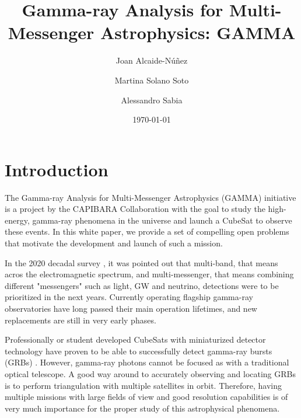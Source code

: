 \documentclass[
    aps,
    prd,
    twocolumn,
    nofootinbib,
    floatfix,
    superscriptaddress,
]{revtex4-2}
\begin{document}
\title{Gamma-ray Analysis for Multi-Messenger Astrophysics: GAMMA}

\author{Joan Alcaide-Núñez}

\author{Martina Solano Soto}

\author{Alessandro Sabia}

\date{\today}

\maketitle


\tableofcontents
\vspace{1em}

\section{Introduction}
The Gamma-ray Analysis for Multi-Messenger Astrophysics (GAMMA) initiative is a project by the CAPIBARA Collaboration with the goal to study the high-energy, gamma-ray phenomena in the universe and launch a CubeSat to observe these events. In this white paper, we provide a set of compelling open problems that motivate the development and launch of such a mission.

In the 2020 decadal survey \cite{2020_astro_decadal}, it was pointed out that multi-band, that means acros the electromagnetic spectrum, and multi-messenger, that means combining different "messengers" such as light, GW and neutrino, detections were to be prioritized in the next years. Currently operating flagship gamma-ray observatories have long passed their main operation lifetimes, and new replacements are still in very early phases.

Professionally or student developed CubeSats with miniaturized detector technology have proven to be able to successfully detect gamma-ray bursts (GRBs) \cite{Murphy_2021, ripa2026grbalphavzlusat2grbbeta, Fiore_2020}. However, gamma-ray photons cannot be focused as with a traditional optical telescope. A good way around to accurately observing and locating GRBs is to perform triangulation with multiple satellites in orbit. Therefore, having multiple missions with large fields of view and good resolution capabilities is of very much importance for the proper study of this astrophysical phenomena.
\end{document}
